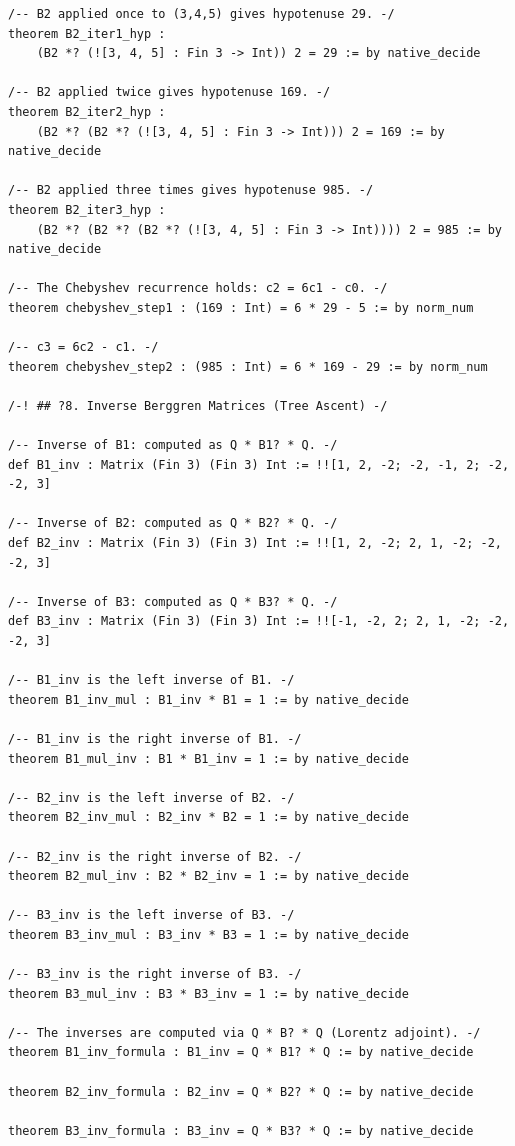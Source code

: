 \documentclass[11pt,twoside,openright]{book}
\theoremstyle{definition}
\theoremstyle{remark}
\begin{document}
\begin{lstlisting}[style=lean]
/-- B2 applied once to (3,4,5) gives hypotenuse 29. -/
theorem B2_iter1_hyp :
    (B2 *? (![3, 4, 5] : Fin 3 -> Int)) 2 = 29 := by native_decide

/-- B2 applied twice gives hypotenuse 169. -/
theorem B2_iter2_hyp :
    (B2 *? (B2 *? (![3, 4, 5] : Fin 3 -> Int))) 2 = 169 := by native_decide

/-- B2 applied three times gives hypotenuse 985. -/
theorem B2_iter3_hyp :
    (B2 *? (B2 *? (B2 *? (![3, 4, 5] : Fin 3 -> Int)))) 2 = 985 := by native_decide

/-- The Chebyshev recurrence holds: c2 = 6c1 - c0. -/
theorem chebyshev_step1 : (169 : Int) = 6 * 29 - 5 := by norm_num

/-- c3 = 6c2 - c1. -/
theorem chebyshev_step2 : (985 : Int) = 6 * 169 - 29 := by norm_num

/-! ## ?8. Inverse Berggren Matrices (Tree Ascent) -/

/-- Inverse of B1: computed as Q * B1? * Q. -/
def B1_inv : Matrix (Fin 3) (Fin 3) Int := !![1, 2, -2; -2, -1, 2; -2, -2, 3]

/-- Inverse of B2: computed as Q * B2? * Q. -/
def B2_inv : Matrix (Fin 3) (Fin 3) Int := !![1, 2, -2; 2, 1, -2; -2, -2, 3]

/-- Inverse of B3: computed as Q * B3? * Q. -/
def B3_inv : Matrix (Fin 3) (Fin 3) Int := !![-1, -2, 2; 2, 1, -2; -2, -2, 3]

/-- B1_inv is the left inverse of B1. -/
theorem B1_inv_mul : B1_inv * B1 = 1 := by native_decide

/-- B1_inv is the right inverse of B1. -/
theorem B1_mul_inv : B1 * B1_inv = 1 := by native_decide

/-- B2_inv is the left inverse of B2. -/
theorem B2_inv_mul : B2_inv * B2 = 1 := by native_decide

/-- B2_inv is the right inverse of B2. -/
theorem B2_mul_inv : B2 * B2_inv = 1 := by native_decide

/-- B3_inv is the left inverse of B3. -/
theorem B3_inv_mul : B3_inv * B3 = 1 := by native_decide

/-- B3_inv is the right inverse of B3. -/
theorem B3_mul_inv : B3 * B3_inv = 1 := by native_decide

/-- The inverses are computed via Q * B? * Q (Lorentz adjoint). -/
theorem B1_inv_formula : B1_inv = Q * B1? * Q := by native_decide

theorem B2_inv_formula : B2_inv = Q * B2? * Q := by native_decide

theorem B3_inv_formula : B3_inv = Q * B3? * Q := by native_decide


\end{lstlisting}
\end{document}
